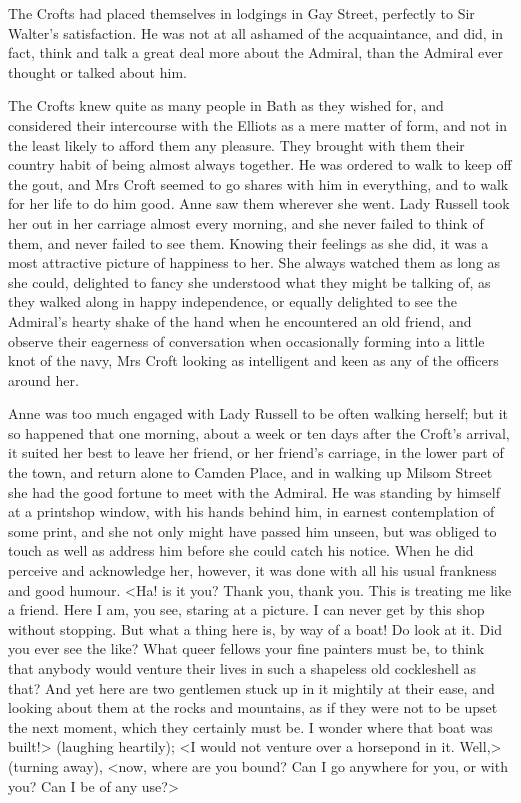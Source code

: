 The Crofts had placed themselves in lodgings in Gay Street, perfectly to Sir Walter's satisfaction. He was not at all ashamed of the acquaintance, and did, in fact, think and talk a great deal more about the Admiral, than the Admiral ever thought or talked about him.

The Crofts knew quite as many people in Bath as they wished for, and considered their intercourse with the Elliots as a mere matter of form, and not in the least likely to afford them any pleasure. They brought with them their country habit of being almost always together. He was ordered to walk to keep off the gout, and Mrs Croft seemed to go shares with him in everything, and to walk for her life to do him good. Anne saw them wherever she went. Lady Russell took her out in her carriage almost every morning, and she never failed to think of them, and never failed to see them. Knowing their feelings as she did, it was a most attractive picture of happiness to her. She always watched them as long as she could, delighted to fancy she understood what they might be talking of, as they walked along in happy independence, or equally delighted to see the Admiral's hearty shake of the hand when he encountered an old friend, and observe their eagerness of conversation when occasionally forming into a little knot of the navy, Mrs Croft looking as intelligent and keen as any of the officers around her.

Anne was too much engaged with Lady Russell to be often walking herself; but it so happened that one morning, about a week or ten days after the Croft's arrival, it suited her best to leave her friend, or her friend's carriage, in the lower part of the town, and return alone to Camden Place, and in walking up Milsom Street she had the good fortune to meet with the Admiral. He was standing by himself at a printshop window, with his hands behind him, in earnest contemplation of some print, and she not only might have passed him unseen, but was obliged to touch as well as address him before she could catch his notice. When he did perceive and acknowledge her, however, it was done with all his usual frankness and good humour. <Ha! is it you? Thank you, thank you. This is treating me like a friend. Here I am, you see, staring at a picture. I can never get by this shop without stopping. But what a thing here is, by way of a boat! Do look at it. Did you ever see the like? What queer fellows your fine painters must be, to think that anybody would venture their lives in such a shapeless old cockleshell as that? And yet here are two gentlemen stuck up in it mightily at their ease, and looking about them at the rocks and mountains, as if they were not to be upset the next moment, which they certainly must be. I wonder where that boat was built!> (laughing heartily); <I would not venture over a horsepond in it. Well,> (turning away), <now, where are you bound? Can I go anywhere for you, or with you? Can I be of any use?>

